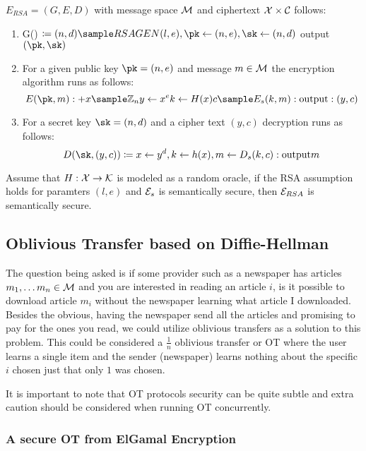 \(E_{RSA} = (G, E, D)\) with message space \(\mathcal{M}\) and ciphertext \(\mathcal{X} \times \mathcal{C}\) follows: 

\begin{enumerate}
    \item G() \(\coloneqq  (n, d) \sample RSAGEN(l, e), \pk \gets (n,e), \sk \gets (n,d)\) output \((\pk, \sk)\)
    \item For a given public key \( \pk = (n, e)\) and message \(m \in \mathcal{M}\) the encryption algorithm runs as follows: 
    \[
         E(\pk, m) :+ x \sample \Z_n y \gets x^e k \gets H(x) c \sample E_s(k, m): \text{output}: (y, c)
    \]    
    \item For a secret key \(\sk = (n,d)\) and a cipher text \( (y, c)\) decryption runs as follows: 
    \[
        D(\sk, (y, c)) \coloneqq  x \gets y^d, k \gets h(x), m \gets D_s(k, c): \text{output} m
    \]  
\end{enumerate}

\begin{theorem}
    Assume that \(H: \mathcal{X} \to \mathcal{K}\) is modeled as a random oracle, if the RSA assumption holds for paramters \((l, e)\) and \(\mathcal{E}_s\) is semantically secure, then \(\mathcal{E}_{RSA}\) is semantically secure.     
\end{theorem}

\subsection{Oblivious Transfer based on Diffie-Hellman}

The question being asked is if some provider such as a newspaper has articles \(m_1, \ldots  m_n \in \mathcal{M} \) and you are interested in reading an article \(i\), is it possible to download article \(m_i\) without the newspaper learning what article I downloaded. Besides the obvious, having the newspaper send all the articles and promising to pay for the ones you read, we could utilize oblivious transfers as a solution to this problem. This could be considered a \(\frac{1}{n}\) oblivious transfer or OT where the user learns a single item and the sender (newspaper) learns nothing about the specific \(i\) chosen just that only \(1\) was chosen. 

It is important to note that OT protocols security can be quite subtle and extra caution should be considered when running OT concurrently. 

\subsubsection{A secure OT from ElGamal Encryption}

